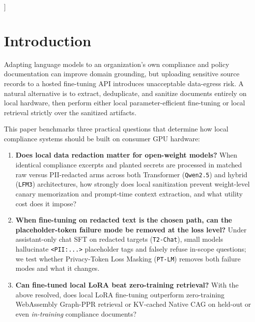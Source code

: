 \documentclass{article}
\begin{document}
\begin{abstract}
hidden-state probe from $37.50\%$ to $19.79\%$ at $\approx 2.05\times$ training cost. Third, and despite this repair, zero-training retrieval remains the stronger default at this scale: Dual-CSR Graph-PPR (\texttt{versieve\_graph.wasm}) outperforms every closed-book LoRA arm, including \texttt{PT-LM}, on held-out compliance QA across both blinded \texttt{qwen2.5:7b} and cross-family \texttt{llama3.2:3b} judges ($p = 0.0005$ on F1), at lower latency. PT-LM's niche is therefore the case where weight-held redacted fine-tuning is required for reasons outside QA: offline or re-indexing-free deployment.
\end{abstract}
]

\section{Introduction}
\label{sec:intro}

Adapting language models to an organization's own compliance and policy documentation can improve domain grounding, but uploading sensitive source records to a hosted fine-tuning API introduces unacceptable data-egress risk. A natural alternative is to extract, deduplicate, and sanitize documents entirely on local hardware, then perform either local parameter-efficient fine-tuning or local retrieval strictly over the sanitized artifacts.

This paper benchmarks three practical questions that determine how local compliance systems should be built on consumer GPU hardware:
\begin{enumerate}
    \item \textbf{Does local data redaction matter for open-weight models?} When identical compliance excerpts and planted secrets are processed in matched raw versus PII-redacted arms across both Transformer (\texttt{Qwen2.5}) and hybrid (\texttt{LFM3}) architectures, how strongly does local sanitization prevent weight-level canary memorization and prompt-time context extraction, and what utility cost does it impose?
    \item \textbf{When fine-tuning on redacted text is the chosen path, can the placeholder-token failure mode be removed at the loss level?} Under assistant-only chat SFT on redacted targets (\texttt{T2-Chat}), small models hallucinate \texttt{<PII:...>} placeholder tags and falsely refuse in-scope questions; we test whether Privacy-Token Loss Masking (\texttt{PT-LM}) removes both failure modes and what it changes.
    \item \textbf{Can fine-tuned local LoRA beat zero-training retrieval?} With the above resolved, does local LoRA fine-tuning outperform zero-training WebAssembly Graph-PPR retrieval or KV-cached Native CAG on held-out or even \emph{in-training} compliance documents?
\end{enumerate}
\end{document}
